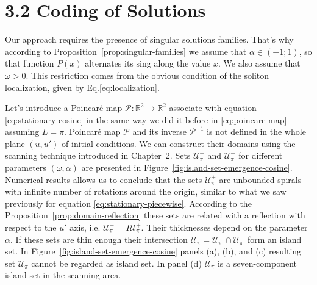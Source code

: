 \section*{3.2 Coding of Solutions}

Our approach requires the presence of singular solutions families.
That's why according to Proposition~\ref{prop:singular-families} we assume that $\alpha \in (-1; 1)$, so that function $P(x)$ alternates its sing along the value $x$.
We also assume that $\omega > 0$.
This restriction comes from the obvious condition of the soliton localization, given by Eq.\eqref{eq:localization}.

Let's introduce a Poincar\'e map $\mathcal{P}: \mathbb{R}^2 \to \mathbb{R}^2$ associate with equation \eqref{eq:stationary-cosine} in the same way we did it before in \eqref{eq:poincare-map} assuming $L = \pi$.
Poincar\'e map $\mathcal{P}$ and its inverse $\mathcal{P}^{-1}$ is not defined in the whole plane $(u, u')$ of initial conditions.
We can construct their domains using the scanning technique introduced in Chapter~2. %
Sets $\mathscr{U}_{\pi}^+$ and $\mathscr{U}_{\pi}^-$ for different parameters $(\omega, \alpha)$ are presented in Figure~\ref{fig:island-set-emergence-cosine}.
Numerical results allows us to conclude that the sets $\mathscr{U}_{\pi}^{\pm}$ are unbounded spirals with infinite number of rotations around the origin, similar to what we saw previously for equation \eqref{eq:stationary-piecewise}.
According to the Proposition~\ref{prop:domain-reflection} these sets are related with a reflection with respect to the $u'$ axis, i.e. $\mathscr{U}_{\pi}^- = I \mathscr{U}_{\pi}^+$.
Their thicknesses depend on the parameter $\alpha$.
If these sets are thin enough their intersection $\mathscr{U}_{\pi} = \mathscr{U}_{\pi}^+ \cap \mathscr{U}_{\pi}^-$ form an island set.
In Figure~\ref{fig:island-set-emergence-cosine} panels (a), (b), and (c) resulting set $\mathscr{U}_{\pi}$ cannot be regarded as island set.
In panel (d) $\mathscr{U}_{\pi}$ is a seven-component island set in the scanning area.

